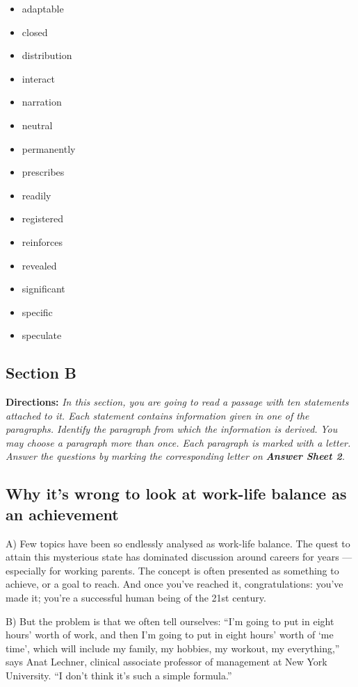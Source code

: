 \documentclass[UTF8,11pt]{ctexart}
\begin{document}
\begin{itemize}[leftmargin=2em,itemsep=.2em,topsep=.4em]\item[A.] adaptable
\item[B.] closed
\item[C.] distribution
\item[D.] interact
\item[E.] narration
\item[F.] neutral
\item[G.] permanently
\item[H.] prescribes
\item[I.] readily
\item[J.] registered
\item[K.] reinforces
\item[L.] revealed
\item[M.] significant
\item[N.] specific
\item[O.] speculate
\end{itemize}

\subsection*{\textbf{Section B}}


\textbf{Directions:} \textit{In this section, you are going to read a passage with ten statements attached to it. Each statement} \textit{contains information given in one of the paragraphs. Identify the paragraph from which the information is derived.} \textit{You may choose a paragraph more than once. Each paragraph is marked with a letter. Answer the questions by} \textit{marking the corresponding letter on }\textbf{\textit{Answer Sheet 2}}\textit{.}


\subsection*{\textbf{Why it’s wrong to look at work-life balance as an achievement}}


A) Few topics have been so endlessly analysed as work-life balance. The quest to attain this mysterious state has dominated discussion around careers for years — especially for working parents. The concept is often presented as something to achieve, or a goal to reach. And once you’ve reached it, congratulations: you’ve made it; you’re a successful human being of the 21st century.


B) But the problem is that we often tell ourselves: “I’m going to put in eight hours’ worth of work, and then I’m going to put in eight hours’ worth of ‘me time’, which will include my family, my hobbies, my workout, my everything,” says Anat Lechner, clinical associate professor of management at New York University. “I don’t think it’s such a simple formula.”
\end{document}
